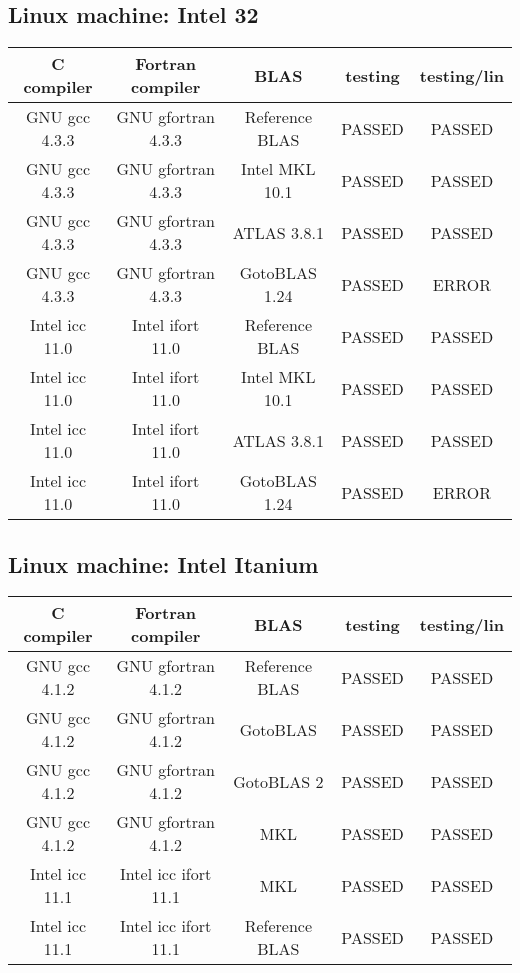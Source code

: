 \subsection{Linux machine: Intel 32}
\begin{tabular}{| c | c | c | c | c |}
\hline
C compiler & Fortran compiler & BLAS                 & testing     &  testing/lin \\ 
\hline \hline
GNU gcc 4.3.3  & GNU gfortran 4.3.3    & Reference BLAS        &       PASSED      &       PASSED              \\ \hline
GNU gcc 4.3.3  & GNU gfortran 4.3.3    & Intel MKL 10.1        &       PASSED      &       PASSED              \\ \hline
GNU gcc 4.3.3  & GNU gfortran 4.3.3    & ATLAS 3.8.1           &       PASSED      &       PASSED              \\ \hline
GNU gcc 4.3.3  & GNU gfortran 4.3.3    & GotoBLAS 1.24         &       PASSED      &       ERROR               \\ \hline
Intel icc 11.0 & Intel ifort 11.0      & Reference BLAS        &       PASSED      &       PASSED              \\ \hline
Intel icc 11.0 & Intel ifort 11.0      & Intel MKL 10.1        &       PASSED      &       PASSED              \\ \hline
Intel icc 11.0 & Intel ifort 11.0      & ATLAS 3.8.1           &       PASSED      &       PASSED              \\ \hline
Intel icc 11.0 & Intel ifort 11.0      & GotoBLAS 1.24         &       PASSED      &       ERROR               \\ \hline
\hline
\end{tabular} 

\subsection{Linux machine: Intel Itanium}
\begin{tabular}{| c | c | c | c | c |}
\hline
C compiler & Fortran compiler & BLAS                 & testing     &  testing/lin \\ 
\hline \hline
GNU gcc 4.1.2      & GNU gfortran 4.1.2    & Reference BLAS  &      PASSED       &       PASSED      \\ \hline
GNU gcc 4.1.2      & GNU gfortran 4.1.2    & GotoBLAS        &      PASSED       &       PASSED      \\ \hline
GNU gcc 4.1.2      & GNU gfortran 4.1.2    & GotoBLAS 2      &      PASSED       &       PASSED      \\ \hline
GNU gcc 4.1.2      & GNU gfortran 4.1.2    & MKL             &      PASSED       &       PASSED      \\ \hline
Intel icc 11.1     & Intel icc ifort 11.1  & MKL             &      PASSED       &       PASSED      \\ \hline
Intel icc 11.1     & Intel icc ifort 11.1  & Reference BLAS  &      PASSED       &       PASSED      \\ \hline
\hline
\end{tabular} 

